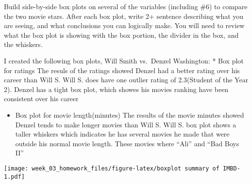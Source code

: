 \documentclass{article}
\newenvironment{Shaded}{\begin{snugshade}}{\end{snugshade}}
\newcommand{\CommentTok}[1]{\textcolor[rgb]{0.56,0.35,0.01}{\textit{#1}}}
\newcommand{\DataTypeTok}[1]{\textcolor[rgb]{0.13,0.29,0.53}{#1}}
\newcommand{\DecValTok}[1]{\textcolor[rgb]{0.00,0.00,0.81}{#1}}
\newcommand{\FloatTok}[1]{\textcolor[rgb]{0.00,0.00,0.81}{#1}}
\newcommand{\KeywordTok}[1]{\textcolor[rgb]{0.13,0.29,0.53}{\textbf{#1}}}
\newcommand{\NormalTok}[1]{#1}
\newcommand{\OperatorTok}[1]{\textcolor[rgb]{0.81,0.36,0.00}{\textbf{#1}}}
\newcommand{\StringTok}[1]{\textcolor[rgb]{0.31,0.60,0.02}{#1}}
\begin{document}
Build side-by-side box plots on several of the variables (including \#6)
to compare the two movie stars. After each box plot, write 2+ sentence
describing what you are seeing, and what conclusions you can logically
make. You will need to review what the box plot is showing with the box
portion, the divider in the box, and the whiskers.

I created the following box plots, Will Smith vs.~Denzel Washington: *
Box plot for ratings The resuls of the ratings showed Denzel had a
better rating over his career than Will S. Will S. does have one outlier
rating of 2.3(Student of the Year 2). Denzel has a tight box plot, which
showes his movies ranking have been consistent over his career

\begin{itemize}
\tightlist
\item
  Box plot for movie length(minutes) The results of the movie minutes
  showed Denzel tends to make longer movies than Will S. Will S. box
  plot shows a taller whiskers which indicates he has several movies he
  made that were outside his normal movie length. These movies where
  ``Ali'' and ``Bad Boys II''
\end{itemize}

\begin{Shaded}
\end{Shaded}

\texttt{[image: week\_03\_homework\_files/figure-latex/boxplot summary of IMBD-1.pdf]}
\end{document}

